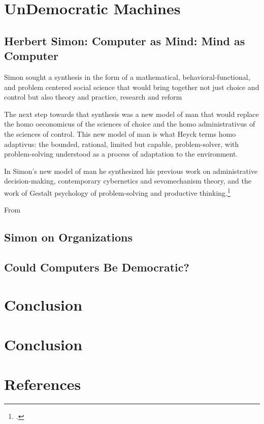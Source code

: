 \documentclass[version=last,draft=true,paper=A4,portrait,twoside=true,twocolumn=false,headinclude=false,footinclude=false,fontsize=12,BCOR=20mm,DIV=calc,pagesize=auto,titlepage=firstiscover,mpinclude=true,open=right,chapterprefix=true,numbers=autoendperiod,headsepline=false,parskip=false]{scrbook}
\begin{document}
\chapter{UnDemocratic Machines}
\label{sec:org61c0b09}
\section{Herbert Simon: Computer as Mind: Mind as Computer}
\label{sec:orgb8f98e0}

Simon sought a synthesis in the form of a mathematical,
behavioral-functional, and problem centered social science that would bring
together not just choice and control but also theory and practice, research
and reform

The next step towards that synthesis was a new model of man that would
replace the homo oeconomicus of the sciences of choice and the homo
administrativus of the sciences of control. This new model of man is what
Heyck terms homo adaptivus: the bounded, rational, limited but capable,
problem-solver, with problem-solving understood as a process of adaptation
to the environment. 

In Simon's new model of man he synthesized his previous work on
administrative decision-making, contemporary cybernetics and sevomechanism
theory, and the work of Gestalt psychology of problem-solving and
productive thinking.\footcite[p. 185, par. 2]{heyck2005} 

From



\section{Simon on Organizations}
\label{sec:org4be2b9f}
\section{Could Computers Be Democratic?}
\label{sec:org0e29f3e}
\chapter{Conclusion}
\label{sec:org39d6f90}
\lipsum

\backmatter
\chapter{Conclusion} 
\lipsum
\chapter{References} 
\printbibliography[heading=none]
\end{document}
